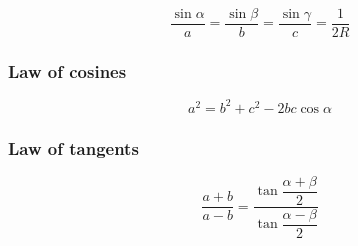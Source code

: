 \begin{equation}
  \dfrac{\sin\alpha}{a}=\dfrac{\sin\beta}{b}=\dfrac{\sin\gamma}{c}=\dfrac{1}{2R}
\end{equation}

\subsubsection{Law of cosines}

\begin{equation}
  a^2=b^2+c^2-2bc\cos\alpha
\end{equation}

\subsubsection{Law of tangents}

\begin{equation}
  \dfrac{a+b}{a-b}=\dfrac{\tan\dfrac{\alpha+\beta}{2}}{\tan\dfrac{\alpha-\beta}{2}}
\end{equation}


